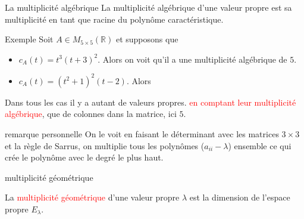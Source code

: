 \begin{parag}{La multiplicité algébrique}
    La multiplicité algébrique d'une valeur propre est sa multiplicité en tant que racine du polynôme caractéristique.
    \begin{subparag}{Exemple}
        Soit $A \in M_{5 \times 5}(\mathbb{R})$ et supposons que 
        \begin{itemize}
            \item $c_A(t) = t^3(t + 3)^2$. Alors on voit qu'il a une multiplicité algébrique de $5$.
            \item $c_A(t) = (t^2 + 1)^2(t-2)$. Alors
        \end{itemize}
        Dans tous les cas il y a autant de valeurs propres. \textcolor{red}{en comptant leur multiplicité algébrique}, que de colonnes dans la matrice, ici $5$.
        \end{subparag}

        \begin{subparag}{remarque personnelle}
            On le voit en faisant le déterminant avec les matrices $3 \times 3$ et la règle de Sarrus, on multiplie tous les polynômes ($a_{ii} - \lambda$) ensemble ce qui crée le polynôme avec le degré le plus haut.
        \end{subparag}
        
        \begin{subparag}{multiplicité géométrique}
        \begin{definition}
            La \textcolor{red}{multiplicité géométrique} d'une valeur propre $\lambda$ est la dimension de l'espace propre $E_\lambda$.
        \end{definition}
    \end{subparag}
\end{parag}

